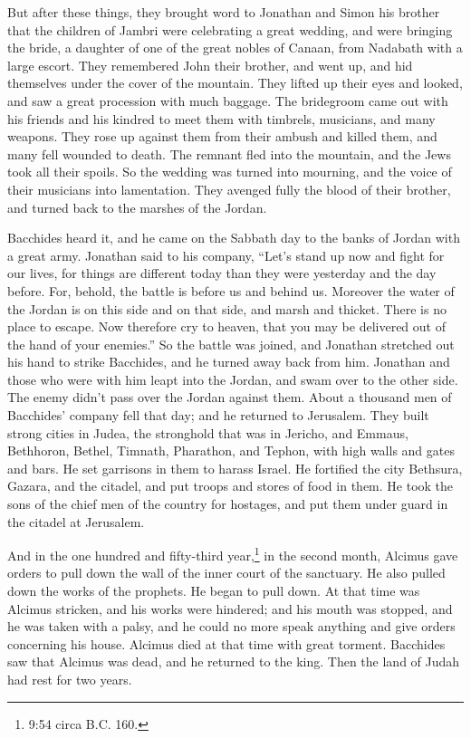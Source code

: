  But after these things, they brought word to Jonathan and
Simon his brother that the children of Jambri were celebrating a great
wedding, and were bringing the bride, a daughter of one of the great
nobles of Canaan, from Nadabath with a large escort.  They
remembered John their brother, and went up, and hid themselves under the
cover of the mountain.  They lifted up their eyes and
looked, and saw a great procession with much baggage. The bridegroom
came out with his friends and his kindred to meet them with timbrels,
musicians, and many weapons.  They rose up against them
from their ambush and killed them, and many fell wounded to death. The
remnant fled into the mountain, and the Jews took all their spoils.
 So the wedding was turned into mourning, and the voice of
their musicians into lamentation.  They avenged fully the
blood of their brother, and turned back to the marshes of the Jordan.

 Bacchides heard it, and he came on the Sabbath day to the
banks of Jordan with a great army.  Jonathan said to his
company, ``Let's stand up now and fight for our lives, for things are
different today than they were yesterday and the day before.
 For, behold, the battle is before us and behind us.
Moreover the water of the Jordan is on this side and on that side, and
marsh and thicket. There is no place to escape.  Now
therefore cry to heaven, that you may be delivered out of the hand of
your enemies.''  So the battle was joined, and Jonathan
stretched out his hand to strike Bacchides, and he turned away back from
him.  Jonathan and those who were with him leapt into the
Jordan, and swam over to the other side. The enemy didn't pass over the
Jordan against them.  About a thousand men of Bacchides'
company fell that day;  and he returned to Jerusalem. They
built strong cities in Judea, the stronghold that was in Jericho, and
Emmaus, Bethhoron, Bethel, Timnath, Pharathon, and Tephon, with high
walls and gates and bars.  He set garrisons in them to
harass Israel.  He fortified the city Bethsura, Gazara, and
the citadel, and put troops and stores of food in them.  He
took the sons of the chief men of the country for hostages, and put them
under guard in the citadel at Jerusalem.

 And in the one hundred and fifty-third year,\footnote{9:54
  circa B.C. 160.} in the second month, Alcimus gave orders to pull down
the wall of the inner court of the sanctuary. He also pulled down the
works of the prophets.  He began to pull down. At that time
was Alcimus stricken, and his works were hindered; and his mouth was
stopped, and he was taken with a palsy, and he could no more speak
anything and give orders concerning his house.  Alcimus
died at that time with great torment.  Bacchides saw that
Alcimus was dead, and he returned to the king. Then the land of Judah
had rest for two years.

